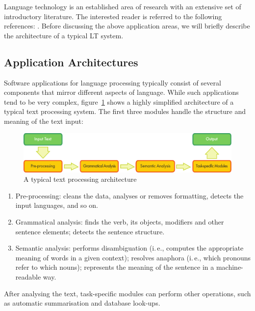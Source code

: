 \begin{multicols}{2}
Language technology is an established area of research with an extensive set of introductory literature. The interested reader is referred to the following references:  \cite{carstensen-etal1, jurafsky-martin01, manning-schuetze1, lt-world1, lt-survey1}.
Before discussing the above application areas, we will briefly describe the architecture of a typical LT system.

\subsection{Application Architectures}

Software applications for language processing typically consist of several components that mirror different aspects of language. While such applications tend to be very complex, figure~\ref{fig:textprocessingarch_en} shows a highly simplified architecture of a typical text processing system. The first three modules handle the structure and meaning of the text input:

\begin{figure}[b]
  \center
  \includegraphics[width=\textwidth]{../_media/english/text_processing_app_architecture}
  \caption{A typical text processing architecture}
\label{fig:textprocessingarch_en}
\end{figure}

\begin{enumerate}
\item Pre-processing: cleans the data, analyses or removes formatting, detects the input languages, and so on.
\item Grammatical analysis: finds the verb, its objects, modifiers and other sentence elements; detects the sentence structure.
\item Semantic analysis: performs disambiguation (i.\,e., computes the appropriate meaning of words in a given context); resolves anaphora (i.\,e., which pronouns refer to which nouns); represents the meaning of the sentence in a machine-readable way.
\end{enumerate}

After analysing the text, task-specific modules can perform other operations, such as automatic summarisation and database look-ups.


\end{multicols}
